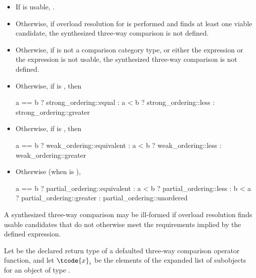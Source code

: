 \begin{itemize}
\item
If  is usable,
.

\item
Otherwise, if overload resolution for  is performed and
finds at least one viable candidate,
the synthesized three-way comparison is not defined.

\item
Otherwise, if  is not a comparison category type, or either
the expression  or the expression 
is not usable,
the synthesized three-way comparison is not defined.

\item
Otherwise, if  is , then
\begin{codeblock}
a == b ? strong_ordering::equal :
a < b  ? strong_ordering::less :
         strong_ordering::greater
\end{codeblock}

\item
Otherwise, if  is , then
\begin{codeblock}
a == b ? weak_ordering::equivalent :
a < b  ? weak_ordering::less :
         weak_ordering::greater
\end{codeblock}

\item
Otherwise (when  is ),
\begin{codeblock}
a == b ? partial_ordering::equivalent :
a < b  ? partial_ordering::less :
b < a  ? partial_ordering::greater :
         partial_ordering::unordered
\end{codeblock}
\end{itemize}

\begin{note}
A synthesized three-way comparison may be ill-formed
if overload resolution finds usable candidates
that do not otherwise meet the requirements implied by the defined expression.
\end{note}

\pnum
Let  be the declared return type of
a defaulted three-way comparison operator function, and
let $\tcode{x}_i$ be the elements of
the expanded list of subobjects for
an object  of type .


